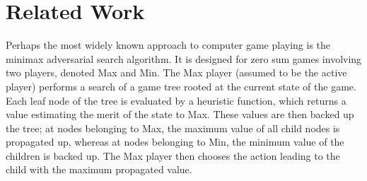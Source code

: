 \documentclass[letterpaper]{article}
\numberwithin{equation}{section}
\numberwithin{theorem}{section}
\numberwithin{lemma}{section}
\numberwithin{df}{section}
\begin{document}
%

\section{Related Work}

Perhaps the most widely known approach to computer game playing is the minimax adversarial search algorithm.  It is designed for zero sum games involving two players, denoted Max and Min.  The Max player (assumed to be the active player) performs a search of a game tree rooted at the current state of the game.  Each leaf node of the tree is evaluated by a heuristic function, which returns a value estimating the merit of the state to Max.  These values are then backed up the tree; at nodes belonging to Max, the maximum value of all child nodes is propagated up, whereas at nodes belonging to Min, the minimum value of the children is backed up.  The Max player then chooses the action leading to the child with the maximum propagated value.

\end{document}
